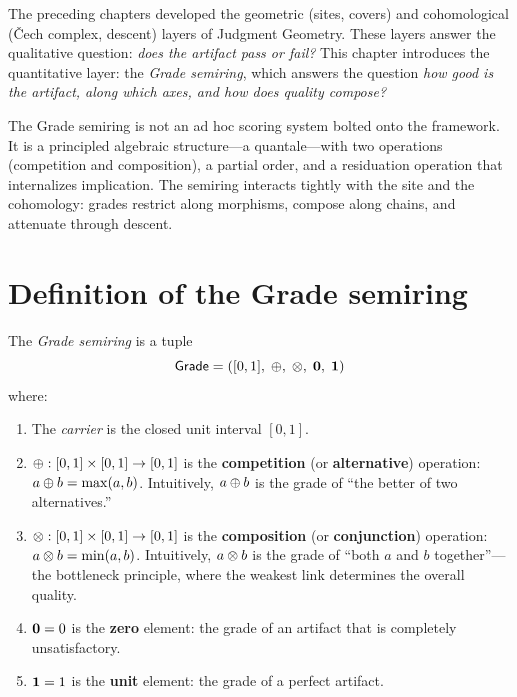 The preceding chapters developed the geometric (sites, covers) and
cohomological (\v{C}ech complex, descent) layers of Judgment Geometry.
These layers answer the qualitative question: \emph{does the artifact
pass or fail?}  This chapter introduces the quantitative layer: the
\emph{Grade semiring}, which answers the question \emph{how good is
the artifact, along which axes, and how does quality compose?}

The Grade semiring is not an ad hoc scoring system bolted onto the
framework.  It is a principled algebraic structure---a quantale---with
two operations (competition and composition), a partial order, and a
residuation operation that internalizes implication.  The semiring
interacts tightly with the site and the cohomology: grades restrict
along morphisms, compose along chains, and attenuate through descent.



\section{Definition of the Grade semiring}
\label{sec:grade:def}

\begin{definition}
\label{def:grade-semiring}
The \emph{Grade semiring} is a tuple
\[
  \mathsf{Grade} = ([0,1],\; \oplus,\; \otimes,\; \mathbf{0},\; \mathbf{1})
\]
where:
\begin{enumerate}[label=(\roman*),itemsep=3pt]
\item The \emph{carrier} is the closed unit interval $[0, 1]$.

\item $\oplus : [0,1] \times [0,1] \to [0,1]$ is the
  \textbf{competition} (or \textbf{alternative}) operation:
  $a \oplus b = \max(a, b)$.  Intuitively, $a \oplus b$ is the grade of
  ``the better of two alternatives.''

\item $\otimes : [0,1] \times [0,1] \to [0,1]$ is the
  \textbf{composition} (or \textbf{conjunction}) operation:
  $a \otimes b = \min(a, b)$.  Intuitively, $a \otimes b$ is the grade of
  ``both $a$ and $b$ together''---the bottleneck principle, where the
  weakest link determines the overall quality.

\item $\mathbf{0} = 0$ is the \textbf{zero} element: the grade of an
  artifact that is completely unsatisfactory.

\item $\mathbf{1} = 1$ is the \textbf{unit} element: the grade of a
  perfect artifact.
\end{enumerate}
\end{definition}

